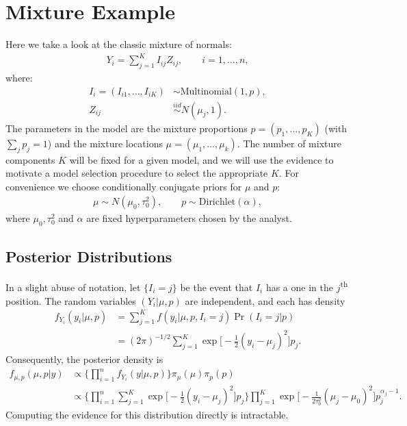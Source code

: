\documentclass[11pt]{article}
\newcommand{\iid}{\stackrel{iid}{\sim}}
\begin{document}
\section{Mixture Example}
Here we take a look at the classic mixture of normals:
\begin{align*}
 Y_{i} = \sum_{j=1}^{K}I_{ij}Z_{ij} , \qquad i=1,\ldots,n , 
\end{align*}
where:
\begin{align*}
 I_{i} = (I_{i1},\ldots,I_{iK}) &\sim \textrm{Multinomial}\left(1,p\right) , \\ 
 Z_{ij} &\iid N\left(\mu_{j},1\right) .
\end{align*}
The parameters in the model are the mixture proportions $p=(p_{1},\ldots,p_{K})$ (with $\sum_{j}p_{j}=1$) and the mixture locations $\mu=(\mu_{1},\ldots,\mu_{k})$. The number of mixture components $K$ will be fixed for a given model, and we will use the evidence to motivate a model selection procedure to select the appropriate $K$. For convenience we choose conditionally conjugate priors for $\mu$ and $p$:
\begin{align*}
    \mu \sim N (\mu_{0},\tau_{0}^{2}), 
    \qquad 
    p \sim \textrm{Dirichlet}(\alpha),
    \end{align*}
where $\mu_{0}, \tau_{0}^{2}$ and $\alpha$ are fixed hyperparameters chosen
by the analyst.

\subsection{Posterior Distributions} \label{sec:posteriors}
In a slight abuse of notation, let $\{I_i = j\}$ be the event that $I_i$ has
a one in the $j$\textsuperscript{th} position.
The random variables $(Y_i \vert \mu, p)$ are independent,
and each has density
\begin{align*}
    f_{Y_i}(y_i \vert \mu, p)
    &=
    \sum_{j=1}^K f(y_i \vert \mu, p, I_i = j) \Pr(I_i = j \vert p)
    \\ &=
    (2\pi)^{-1/2} \sum_{j=1}^K 
        \exp \biggl[
            -\frac{1}{2} (y_i - \mu_j)^2
        \biggr]
        p_j.
\end{align*}
Consequently, the posterior density is
\begin{align*}
    f_{\mu, p}(\mu, p \vert y)
    &\propto
    \Biggl\{ \prod_{i=1}^n f_{Y_i}(y \vert \mu, p) \Biggr\}
    \pi_\mu(\mu) \pi_p(p)
    \\ &\propto
    \Biggl\{
        \prod_{i=1}^n \sum_{j=1}^K 
        \exp \biggl[
            -\frac{1}{2} (y_i - \mu_j)^2
        \biggr]
        p_j
    \Biggr\}
    \prod_{j = 1}^K
    \exp\biggl[
        -\frac{1}{2\tau_0^2} (\mu_j - \mu_0)^2
    \biggr]
    p_j^{\alpha_j - 1}.
\end{align*}
Computing the evidence for this distribution directly is intractable.
\end{document}
